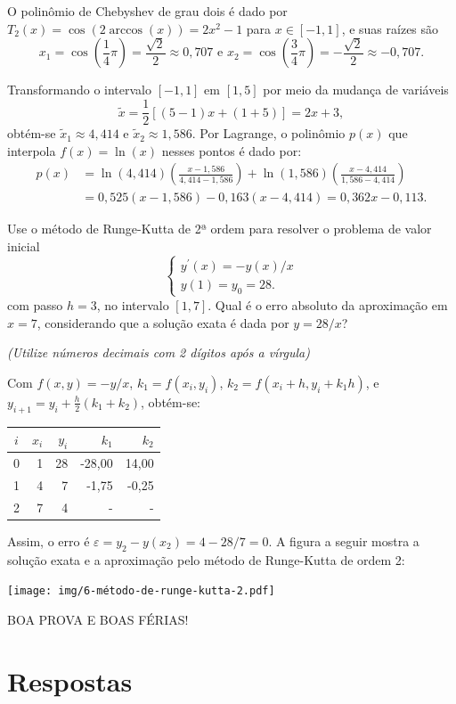 \documentclass[12pt,a4paper]{article}
\begin{document}
\begin{ExerciseList}
\Answer O polinômio de Chebyshev de grau dois é dado por $T_2(x) = \cos(2\arccos(x)) = 2 x^2 - 1$ para $x \in [-1, 1]$, e suas raízes são
\[
x_1 = \cos\left(\frac{1}{4}\pi\right) = \frac{\sqrt{2}}{2} \approx 0,707
\text{ e }
x_2 = \cos\left(\frac{3}{4}\pi\right) = -\frac{\sqrt{2}}{2} \approx -0,707.
\]

Transformando o intervalo $[-1, 1]$ em $[1, 5]$ por meio da mudança de variáveis
\[
\tilde{x} = \frac{1}{2}[(5-1)x + (1+5)] = 2x + 3,
\]
obtém-se $\tilde{x}_1 \approx 4,414$ e $\tilde{x}_2 \approx 1,586$. Por Lagrange, o polinômio $p(x)$ que interpola $f(x) = \ln(x)$ nesses pontos é dado por:
\begin{align*}
p(x)
& = \ln(4,414) \left(\frac{x - 1,586}{4,414 - 1,586}\right)
+ \ln(1,586) \left(\frac{x - 4,414}{1,586 - 4,414}\right)\\
& = 0,525 (x - 1,586) - 0,163 (x - 4,414)
  = 0,362 x - 0,113.
\end{align*}

\Exercise[title={2,0}] Use o método de Runge-Kutta de 2ª ordem para resolver o problema de valor inicial
\[
\begin{cases}
y^\prime(x) = -y(x)/x \\
y(1) = y_0 = 28.
\end{cases}
\]
com passo $h=3$, no intervalo $[1, 7]$. Qual é o erro absoluto da aproximação em $x=7$, considerando que a solução exata é dada por $y = 28/x$?

{\color{blue} \textit{(Utilize números decimais com 2 dígitos após a vírgula)}}

\Answer
Com $f(x,y) = -y/x$,
$k_1 = f(x_i, y_i)$,
$k_2 = f(x_i + h, y_i + k_1 h)$, e
$y_{i+1} = y_i + \frac{h}{2} (k_1 + k_2)$, obtém-se:
\medskip
\begin{center}
    \begin{tabular}{crrrr}
    \hline
       $i$ & $x_i$  & $y_i$ & $k_1$ & $k_2$ \\
    \hline
    0 & 1 & 28 & -28,00 & 14,00 \\
    1 & 4 &  7 &  -1,75 & -0,25 \\
    2 & 7 &  4 &  - & - \\
    \hline
    \end{tabular}
\end{center}
\medskip
Assim, o erro é $\varepsilon = y_2 - y(x_2) = 4 - 28/7 = 0$. A figura a seguir mostra a solução exata e a aproximação pelo método de Runge-Kutta de ordem 2:
\medskip
\begin{center}
\texttt{[image: img/6-método-de-runge-kutta-2.pdf]}
\end{center}
\end{ExerciseList}

\begin{center}
BOA PROVA E BOAS FÉRIAS!
\end{center}

\newpage
\restoregeometry
\section*{Respostas}
\shipoutAnswer
\end{document}
